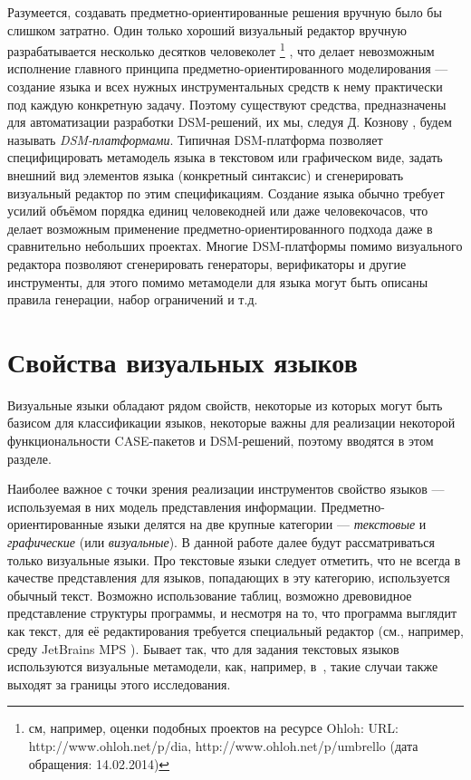 Разумеется, создавать предметно-ориентированные решения вручную было бы слишком 
затратно. Один только хороший визуальный редактор вручную разрабатывается 
несколько десятков человеколет
\footnote{см, например, оценки подобных проектов на ресурсе Ohloh: 
URL: http://www.ohloh.net/p/dia, http://www.ohloh.net/p/umbrello (дата обращения: 14.02.2014)}
, что делает невозможным исполнение главного 
принципа предметно-ориентированного моделирования --- создание языка и всех 
нужных инструментальных средств к нему практически под каждую конкретную задачу. 
Поэтому существуют средства, предназначены для автоматизации разработки 
DSM-решений, их мы, следуя Д. Кознову 
, будем называть \textit{DSM-платформами}. Типичная DSM-платформа позволяет 
специфицировать метамодель языка в текстовом или графическом виде, задать 
внешний вид элементов языка (конкретный синтаксис) и сгенерировать визуальный 
редактор по этим спецификациям. Создание языка обычно требует усилий объёмом 
порядка единиц человекодней или даже человекочасов, что делает возможным 
применение предметно-ориентированного подхода даже в сравнительно небольших 
проектах. Многие DSM-платформы помимо визуального редактора позволяют 
сгенерировать генераторы, верификаторы и другие инструменты, для этого помимо 
метамодели для языка могут быть описаны правила генерации, набор ограничений 
и т.д.

\section{Свойства визуальных языков}
Визуальные языки обладают рядом свойств, некоторые из которых могут быть базисом 
для классификации языков, некоторые важны для реализации некоторой 
функциональности CASE-пакетов и DSM-решений, поэтому вводятся в этом разделе.

Наиболее важное с точки зрения реализации инструментов свойство языков --- 
используемая в них модель представления информации. Предметно-ориентированные 
языки делятся на две крупные категории --- \textit{текстовые} и \textit{графические} 
(или \textit{визуальные}). В данной работе далее будут рассматриваться только визуальные 
языки. 
Про текстовые языки следует отметить, что не всегда в качестве представления для языков, 
попадающих в эту категорию, используется обычный текст. Возможно использование таблиц, 
возможно древовидное представление структуры программы, и несмотря на то, что программа 
выглядит как текст, для её редактирования требуется специальный редактор (см., например, среду 
JetBrains MPS 
). Бывает так, что для задания текстовых языков используются визуальные метамодели,
как, например, в~\cite{karlsch2007model}, такие случаи также выходят за границы этого исследования.

